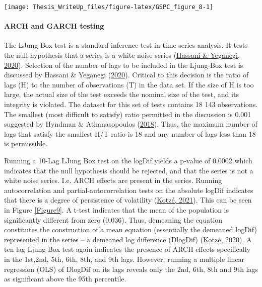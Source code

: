 \documentclass[11pt,preprint, authoryear]{elsarticle}
\let\origfigure\figure
\let\endorigfigure\endfigure
\renewenvironment{figure}[1][2] {
    \expandafter\origfigure\expandafter[H]
} {
    \endorigfigure
}
\numberwithin{equation}{section}
\numberwithin{figure}{section}
\numberwithin{table}{section}
\begin{document}
\begin{figure}[H]

{\centering \texttt{[image: Thesis\_WriteUp\_files/figure-latex/GSPC\_figure\_8-1]}

}

\caption{stdVolControlled and absolute LogDiff \label{Figure8}}\label{fig:GSPC_figure_8}
\end{figure}

\hypertarget{arch-and-garch-testing}{%
\paragraph{\texorpdfstring{ARCH and GARCH testing
\label{ARCHandGARCH}}{ARCH and GARCH testing }}\label{arch-and-garch-testing}}

The LJung-Box test is a standard inference test in time series analysis.
It tests the null-hypothesis that a series is a white noise series
(\protect\hyperlink{ref-hassani2020selecting}{Hassani \& Yeganegi,
2020}). Selection of the number of lags to be included in the Ljung-Box
test is discussed by Hassani \& Yeganegi
(\protect\hyperlink{ref-hassani2020selecting}{2020}). Critical to this
decision is the ratio of lags (H) to the number of observations (T) in
the data set. If the size of H is too large, the actual size of the test
exceeds the nominal size of the test, and its integrity is violated. The
dataset for this set of tests contains 18 143 observations. The smallest
(most difficult to satisfy) ratio permitted in the discussion is 0.001
suggested by Hyndman \& Athanasopoulos
(\protect\hyperlink{ref-hyndman2018forecasting}{2018}). Thus, the
maximum number of lags that satisfy the smallest H/T ratio is 18 and any
number of lags less than 18 is permissible.

Running a 10-Lag LJung Box test on the logDif yields a p-value of 0.0002
which indicates that the null hypothesis should be rejected, and that
the series is not a white noise series. I.e. ARCH effects are present in
the series. Running autocorrelation and partial-autocorrelation tests on
the absolute logDif indicates that there is a degree of persistence of
volatility (\protect\hyperlink{ref-kotze2021volatility}{Kotzé, 2021}).
This can be seen in Figure \ref{Figure9}. A t-test indicates that the
mean of the population is significantly different from zero (0.036).
Thus, demeaning the equation constitutes the construction of a mean
equation (essentially the demeaned logDif) represented in the series --
a demeaned log difference (DlogDif)
(\protect\hyperlink{ref-kotze2020univariate}{Kotzé, 2020}). A ten lag
Ljung-Box test again indicates the presence of ARCH effects specifically
in the 1st,2nd, 5th, 6th, 8th, and 9th lags. However, running a multiple
linear regression (OLS) of DlogDif on its lags reveals only the 2nd,
6th, 8th and 9th lags as significant above the 95th percentile.
\end{document}
